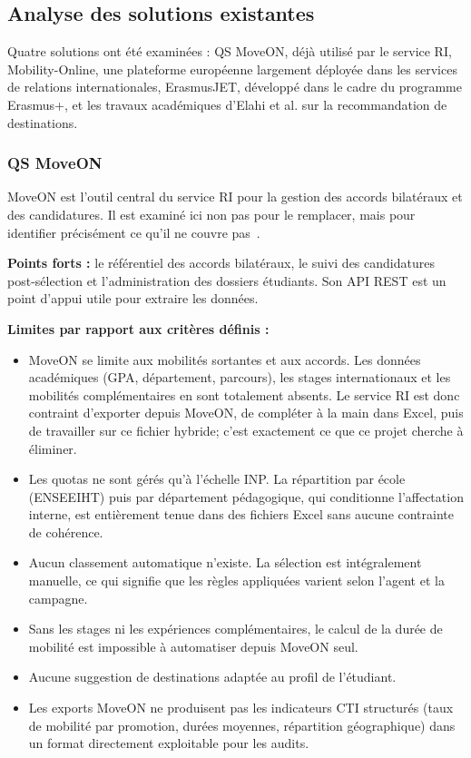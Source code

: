\subsection{Analyse des solutions existantes}

Quatre solutions ont été examinées : QS MoveON, déjà utilisé par le service RI, Mobility-Online, une plateforme européenne largement déployée dans les services de relations internationales, ErasmusJET, développé dans le cadre du programme Erasmus+, et les travaux académiques d'Elahi et al. sur la recommandation de destinations.

\subsubsection{QS MoveON}

MoveON est l'outil central du service RI pour la gestion des accords bilatéraux et des candidatures. Il est examiné ici non pas pour le remplacer, mais pour identifier précisément ce qu'il ne couvre pas~\cite{qs_moveon}.

\textbf{Points forts  :} le référentiel des accords bilatéraux, le suivi des candidatures post-sélection et l'administration des dossiers étudiants. Son API REST est un point d'appui utile pour extraire les données.

\textbf{Limites par rapport aux critères définis :}

\begin{itemize}
    \item MoveON se limite aux mobilités sortantes et aux accords. Les données académiques (GPA, département, parcours), les stages internationaux et les mobilités complémentaires en sont totalement absents. Le service RI est donc contraint d'exporter depuis MoveON, de compléter à la main dans Excel, puis de travailler sur ce fichier hybride; c'est exactement ce que ce projet cherche à éliminer.

    \item Les quotas ne sont gérés qu'à l'échelle INP. La répartition par école (ENSEEIHT) puis par département pédagogique, qui conditionne l'affectation interne, est entièrement tenue dans des fichiers Excel sans aucune contrainte de cohérence.

    \item Aucun classement automatique n'existe. La sélection est intégralement manuelle, ce qui signifie que les règles appliquées varient selon l'agent et la campagne.

    \item Sans les stages ni les expériences complémentaires, le calcul de la durée de mobilité est impossible à automatiser depuis MoveON seul.

    \item Aucune suggestion de destinations adaptée au profil de l'étudiant.

    \item Les exports MoveON ne produisent pas les indicateurs CTI structurés (taux de mobilité par promotion, durées moyennes, répartition géographique) dans un format directement exploitable pour les audits.
\end{itemize}

